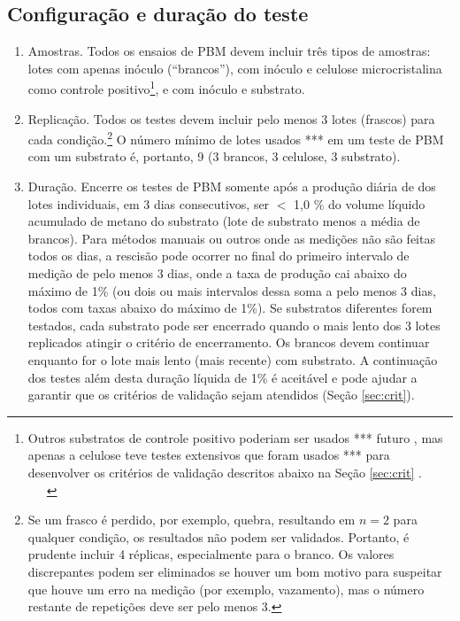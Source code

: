 \documentclass[]{article}
\begin{document}
\subsection{Configuração e duração do teste}
\label{sec:setup}
\begin{enumerate}
  \item Amostras. 
Todos os ensaios de PBM devem incluir três tipos de amostras: lotes com apenas inóculo (``brancos''), com inóculo e celulose microcristalina como controle positivo\footnote{
      Outros substratos de controle positivo poderiam ser usados *** futuro \citep{kochEvaluationCommonSupermarket2020}, mas apenas a celulose teve testes extensivos que foram usados *** para desenvolver os critérios de validação descritos abaixo na Seção \ref{sec:crit} \citep{hafnerImprovingInterlaboratoryReproducibility2020}.
    }, e com inóculo e substrato.
  \item Replicação. 
        Todos os testes devem incluir pelo menos 3 lotes (frascos) para cada condição.\footnote{
          Se um frasco é perdido, por exemplo, quebra, resultando em $ n = 2 $ para qualquer condição, os resultados não podem ser validados.
          Portanto, é prudente incluir 4 réplicas, especialmente para o branco.
          Os valores discrepantes podem ser eliminados se houver um bom motivo para suspeitar que houve um erro na medição (por exemplo, vazamento), mas o número restante de repetições deve ser pelo menos 3.
        }
        O número mínimo de lotes usados *** em um teste de PBM com um substrato é, portanto, 9 (3 brancos, 3 celulose, 3 substrato).
  \item Duração. 
        Encerre os testes de PBM somente após a produção diária de  dos lotes individuais, em 3 dias consecutivos, ser $<$ 1,0 \% do volume líquido acumulado de metano do substrato (lote de substrato menos a média de brancos). 
        Para métodos manuais ou outros onde as medições não são feitas todos os dias, a rescisão pode ocorrer no final do primeiro intervalo de medição de pelo menos 3 dias, onde a taxa de produção cai abaixo do máximo de 1\% (ou dois ou mais intervalos dessa soma a pelo menos 3 dias, todos com taxas abaixo do máximo de 1\%).
        Se substratos diferentes forem testados, cada substrato pode ser encerrado quando o mais lento dos 3 lotes replicados atingir o critério de encerramento.
        Os brancos devem continuar enquanto for o lote mais lento (mais recente) com substrato.
        A continuação dos testes além desta duração líquida de 1\% é aceitável e pode ajudar a garantir que os critérios de validação sejam atendidos (Seção \ref{sec:crit}).
\end{enumerate}
\end{document}
